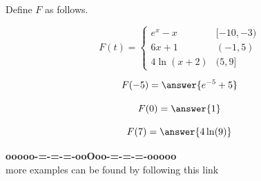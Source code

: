 \documentclass{ximera}
\begin{document}
\begin{example}

Define $F$ as follows.


\[
F(t) = 
\begin{cases}
  e^x - x   &    [-10, -3)     \\
  6x + 1  &    (-1, 5) \\
  4 \ln(x+2)    &    (5, 9]
\end{cases}
\]




\begin{question}

\[
F(-5) = \answer{e^{-5} + 5}
\]


\end{question}




\begin{question}

\[
F(0) = \answer{1}
\]


\end{question}






\begin{question}

\[
F(7) = \answer{4 \ln(9)}
\]


\end{question}




\end{example}











































\begin{onlineOnly}
\begin{center}
\textbf{\textcolor{green!50!black}{ooooo-=-=-=-ooOoo-=-=-=-ooooo}} \\

more examples can be found by following this link\\ 

\end{center}
\end{onlineOnly}
\end{document}
